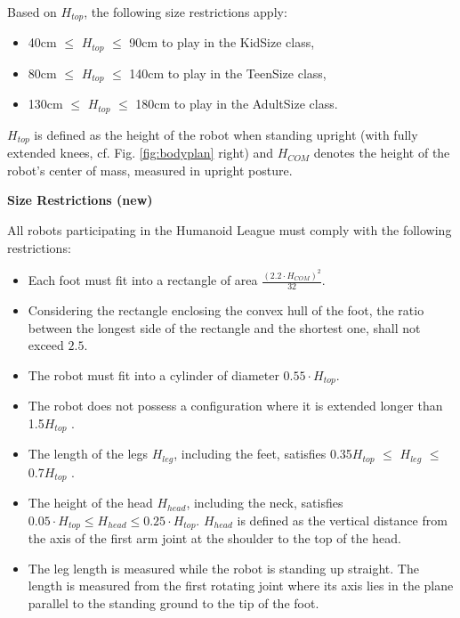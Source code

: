 \headlinebox

Based on $H_{top}$, the following size restrictions apply:

\begin{itemize}
\item 40cm ${\leq}$ $H_{top}$ ${\leq}$ 90cm to play in the KidSize class, 
\item 80cm ${\leq}$ $H_{top}$ ${\leq}$ 140cm to play in the TeenSize class,
\item 130cm ${\leq}$ $H_{top}$ ${\leq}$ 180cm to play in the AdultSize class.
\end{itemize}

$H_{top}$ is defined as the height of the robot when standing upright (with fully extended knees, cf. Fig. \ref{fig:bodyplan} right) and $H_{COM}$ denotes the height of the robot's center of mass, measured in upright posture.

\bigskip

{\bfseries Size Restrictions (new)}

\headlinebox

All robots participating in the Humanoid League must comply with the following restrictions:

\begin{itemize}
\item Each foot must fit into a rectangle of area $\frac{(2.2 \cdot H_{COM})^2}{32}$. 
\item Considering the rectangle enclosing the convex hull of the foot, the ratio between the longest side of the rectangle and the shortest one, shall not exceed $2.5$.
\item The robot must fit into a cylinder of diameter $0.55 \cdot H_{top}$.
\item The robot does not possess a configuration where it is extended longer than 1.5{\textperiodcentered}$H_{top}$ .
\item The length of the legs $H_{leg}$, including the feet, satisfies 0.35{\textperiodcentered}$H_{top}$ ${\leq}$ $H_{leg}$ ${\leq}$ 0.7{\textperiodcentered}$H_{top}$ .
\item The height of the head $H_{head}$, including the neck, satisfies $0.05 \cdot H_{top} \leq H_{head} \leq 0.25 \cdot H_{top}$. $H_{head}$ is defined as the vertical distance from the axis of the first arm joint at the shoulder to the top of the head.
\item The leg length is measured while the robot is standing up straight. The length is measured from the first rotating joint where its axis lies in the plane parallel to the standing ground to the tip of the foot.
\end{itemize}


